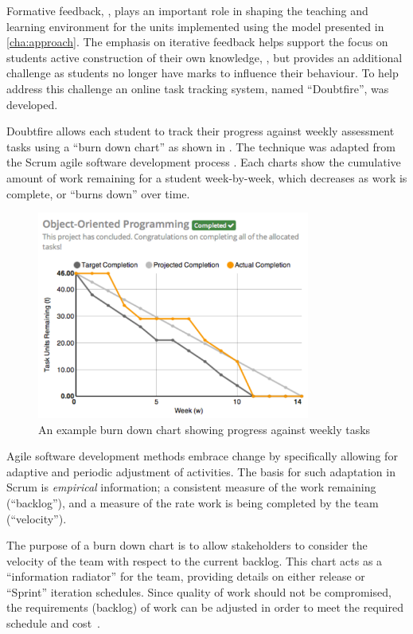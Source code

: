 Formative feedback, , plays an important role in shaping the teaching and learning environment for the units implemented using the model presented in \cref{cha:approach}. The emphasis on iterative feedback helps support the focus on students active construction of their own knowledge, , but provides an additional challenge as students no longer have marks to influence their behaviour. To help address this challenge an online task tracking system, named ``Doubtfire'', was developed. 

Doubtfire allows each student to track their progress against weekly assessment tasks using a ``burn down chart'' as shown in . The technique was adapted from the Scrum agile software development process \cite{Schwaber:2002}. Each charts show the cumulative amount of work remaining for a student week-by-week, which decreases as work is complete, or ``burns down'' over time.

\begin{figure}[thb]
  \centering
  \includegraphics[width=0.8\textwidth]{ExampleChart}
  \caption{An example burn down chart showing progress against weekly tasks}
  \label{fig:example_chart}
\end{figure}

Agile software development methods \cite{Beck:2001} embrace change \cite{Beck:2000} by specifically allowing for adaptive and periodic adjustment of activities. The basis for such adaptation in Scrum is \emph{empirical} information; a consistent measure of the work remaining (``backlog''), and a measure of the rate work is being completed by the team (``velocity'').

The purpose of a burn down chart is to allow stakeholders to consider the velocity of the team with respect to the current backlog. This chart acts as a ``information radiator'' \cite{Cockburn:2002} for the team, providing details on either release or ``Sprint'' iteration schedules. Since quality of work should not be compromised, the requirements (backlog) of work can be adjusted in order to meet the required schedule and cost~\cite{Sutherland:2007}.

